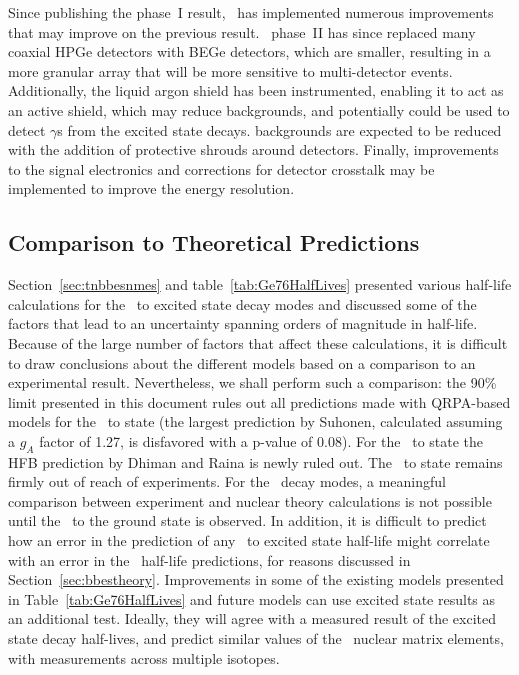 \documentclass[/main.tex]{subfiles}
\begin{document}
Since publishing the phase~I result\cite{gerdaESresult}, \Gerda\ has implemented numerous improvements that may improve on the previous result\cite{gerda2018}.
\Gerda\ phase~II has since replaced many coaxial HPGe detectors with BEGe detectors, which are smaller, resulting in a more granular array that will be more sensitive to multi-detector events.
Additionally, the liquid argon shield has been instrumented, enabling it to act as an active shield, which may reduce backgrounds, and potentially could be used to detect $\gamma$s from the excited state decays.
 backgrounds are expected to be reduced with the addition of protective shrouds around detectors.
Finally, improvements to the signal electronics and corrections for detector crosstalk may be implemented to improve the energy resolution.

\subsection{Comparison to Theoretical Predictions}
Section~\ref{sec:tnbbesnmes} and table~\ref{tab:Ge76HalfLives} presented various half-life calculations for the \tnbb\ to excited state decay modes and discussed some of the factors that lead to an uncertainty spanning orders of magnitude in half-life.
Because of the large number of factors that affect these calculations, it is difficult to draw conclusions about the different models based on a comparison to an experimental result.
Nevertheless, we shall perform such a comparison: the 90\% limit presented in this document rules out all predictions made with QRPA-based models for the \tnbb\ to  state (the largest prediction by Suhonen\cite{gerdaESresult}, calculated assuming a $g_A$ factor of 1.27, is disfavored with a p-value of 0.08).
For the \tnbb\ to  state the HFB prediction by Dhiman and Raina\cite{dhiman1994} is newly ruled out.
The \tnbb\ to  state remains firmly out of reach of experiments.
For the \znbb\ decay modes, a meaningful comparison between experiment and nuclear theory calculations is not possible until the \znbb\ to the ground state is observed.
In addition, it is difficult to predict how an error in the prediction of any \tnbb\ to excited state half-life might correlate with an error in the \znbb\ half-life predictions, for reasons discussed in Section~\ref{sec:bbestheory}.
Improvements in some of the existing models presented in Table~\ref{tab:Ge76HalfLives} and future models can use excited state results as an additional test.
Ideally, they will agree with a measured result of the excited state decay half-lives, and predict similar values of the \znbb\ nuclear matrix elements, with measurements across multiple isotopes.
\end{document}
